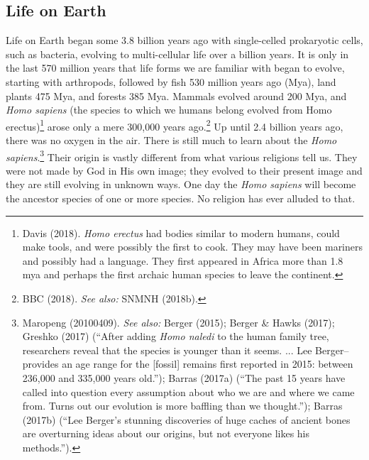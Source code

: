 \begin{multicols}{2}
\section{Life on Earth}

Life on Earth began some 3.8 billion years ago with single-celled prokaryotic cells, such as bacteria, evolving to multi-cellular life over a billion years. It is only in the last 570 million years that life forms we are familiar with began to evolve, starting with arthropods, followed by fish 530 million years ago (Mya), land plants 475 Mya, and forests 385 Mya. Mammals evolved around 200 Mya, and \textit{Homo sapiens} (the species to which we humans belong evolved from Homo erectus)\footnote{Davis (2018). \textit{Homo erectus} had bodies similar to modern humans, could make tools, and were possibly the first to cook. They may have been mariners and possibly had a language. They first appeared in Africa more than 1.8 mya and perhaps the first archaic human species to leave the continent.} arose only a mere 300,000 years ago.\footnote{BBC (2018). \textit{See also:} SNMNH (2018b).} Up until 2.4 billion years ago, there was no oxygen in the air. There is still much to learn about the \textit{Homo sapiens}.\footnote{Maropeng (20100409). \textit{See also:} Berger (2015); Berger \& Hawks (2017); Greshko (2017) (“After adding \textit{Homo naledi} to the human family tree, researchers reveal that the species is younger than it seems. ... Lee Berger--provides an age range for the [fossil] remains first reported in 2015: between 236,000 and 335,000 years old.”); Barras (2017a) (“The past 15 years have called into question every assumption about who we are and where we came from. Turns out our evolution is more baffling than we thought.”); Barras (2017b) (“Lee Berger’s stunning discoveries of huge caches of ancient bones are overturning ideas about our origins, but not everyone likes his methods.”).} Their origin is vastly different from what various religions tell us. They were not made by God in His own image; they evolved to their present image and they are still evolving in unknown ways. One day the \textit{Homo sapiens} will become the ancestor species of one or more species. No religion has ever alluded to that.


\end{multicols}
